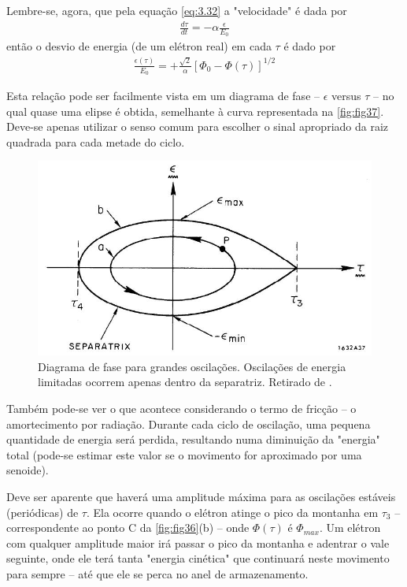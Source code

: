 Lembre-se, agora, que pela equação \eqref{eq:3.32} a "velocidade" é dada por
\begin{align*}
	\frac{d\tau}{dt} = -\alpha \frac{\epsilon}{E_0}
\end{align*}
então o desvio de energia (de um elétron real) em cada $\tau$ é dado por
\begin{align}
	\frac{\epsilon(\tau)}{E_0} = + \frac{\sqrt{2}}{\alpha}[\Phi_0-\Phi(\tau)]^{1/2}\label{eq:3.56}
\end{align}

Esta relação pode ser facilmente vista em um diagrama de fase -- $\epsilon$ versus $\tau$ -- no qual quase uma elipse é obtida, semelhante à curva representada na \autoref{fig:fig37}. Deve-se apenas utilizar o senso comum para escolher o sinal apropriado da raiz quadrada para cada metade do ciclo.

\begin{figure}[!htb]
	\centering
	\includegraphics[width=0.7\linewidth]{./Figuras/fig37.jpeg}
	\caption{Diagrama de fase para grandes oscilações. Oscilações de energia limitadas ocorrem apenas dentro da separatriz. Retirado de \cite{sands1970physics}.}
	\label{fig:fig37}
\end{figure}

Também pode-se ver o que acontece considerando o termo de fricção -- o amortecimento por radiação. Durante cada ciclo de oscilação, uma pequena quantidade de energia será perdida, resultando numa diminuição da "energia" total (pode-se estimar este valor se o movimento for aproximado por uma senoide).

Deve ser aparente que haverá uma amplitude máxima para as oscilações estáveis (periódicas) de $\tau$. Ela ocorre quando o elétron atinge o pico da montanha em $\tau_3$ -- correspondente ao ponto C da \autoref{fig:fig36}(b) -- onde $\Phi(\tau)$ é $\Phi_{max}$. Um elétron com qualquer amplitude maior irá passar o pico da montanha e adentrar o vale seguinte, onde ele terá tanta "energia cinética" que continuará neste movimento para sempre -- até que ele se perca no anel de armazenamento.

